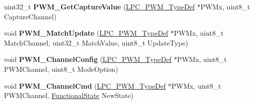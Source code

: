 \begin{DoxyCompactItemize}
\item 
\hypertarget{group___p_w_m___public___functions_ga874b6578612d73f8555f229efa7dab40}{uint32\-\_\-t {\bfseries \-P\-W\-M\-\_\-\-Get\-Capture\-Value} (\hyperlink{struct_l_p_c___p_w_m___type_def}{\-L\-P\-C\-\_\-\-P\-W\-M\-\_\-\-Type\-Def} $\ast$\-P\-W\-Mx, uint8\-\_\-t \-Capture\-Channel)}\label{group___p_w_m___public___functions_ga874b6578612d73f8555f229efa7dab40}

\item 
\hypertarget{group___p_w_m___public___functions_ga1f0927b98fd5eb68c820b8fbf0268164}{void {\bfseries \-P\-W\-M\-\_\-\-Match\-Update} (\hyperlink{struct_l_p_c___p_w_m___type_def}{\-L\-P\-C\-\_\-\-P\-W\-M\-\_\-\-Type\-Def} $\ast$\-P\-W\-Mx, uint8\-\_\-t \-Match\-Channel, uint32\-\_\-t \-Match\-Value, uint8\-\_\-t \-Update\-Type)}\label{group___p_w_m___public___functions_ga1f0927b98fd5eb68c820b8fbf0268164}

\item 
\hypertarget{group___p_w_m___public___functions_ga655a4373a1a7c420a39da54aaef79196}{void {\bfseries \-P\-W\-M\-\_\-\-Channel\-Config} (\hyperlink{struct_l_p_c___p_w_m___type_def}{\-L\-P\-C\-\_\-\-P\-W\-M\-\_\-\-Type\-Def} $\ast$\-P\-W\-Mx, uint8\-\_\-t \-P\-W\-M\-Channel, uint8\-\_\-t \-Mode\-Option)}\label{group___p_w_m___public___functions_ga655a4373a1a7c420a39da54aaef79196}

\item 
\hypertarget{group___p_w_m___public___functions_gafdeb99d7221d80a71b741cac2461c671}{void {\bfseries \-P\-W\-M\-\_\-\-Channel\-Cmd} (\hyperlink{struct_l_p_c___p_w_m___type_def}{\-L\-P\-C\-\_\-\-P\-W\-M\-\_\-\-Type\-Def} $\ast$\-P\-W\-Mx, uint8\-\_\-t \-P\-W\-M\-Channel, \hyperlink{group___l_p_c___types___public___types_gac9a7e9a35d2513ec15c3b537aaa4fba1}{\-Functional\-State} \-New\-State)}\label{group___p_w_m___public___functions_gafdeb99d7221d80a71b741cac2461c671}

\end{DoxyCompactItemize}
